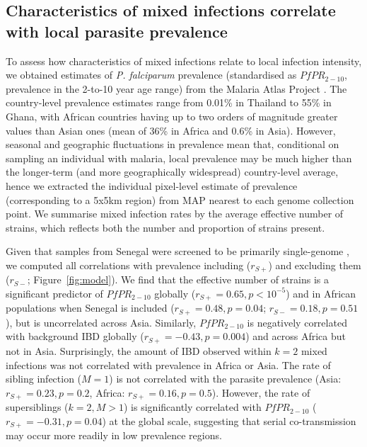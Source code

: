 \documentclass[9pt,lineno]{elife}
\begin{document}
\subsection{Characteristics of mixed infections correlate with local parasite prevalence}

To assess how characteristics of mixed infections relate to local infection intensity, we obtained estimates of {\it P. falciparum} prevalence (standardised as $PfPR_{2-10}$, prevalence in the 2-to-10 year age range) from the Malaria Atlas Project \citep[see Table~\ref{tab:Pf3k}]{MAP2017}. The country-level prevalence estimates range from 0.01\% in Thailand to 55\% in Ghana, with African countries having up to two orders of magnitude greater values than Asian ones (mean of 36\% in Africa and 0.6\% in Asia). However, seasonal and geographic fluctuations in prevalence mean that, conditional on sampling an individual with malaria, local prevalence may be much higher than the longer-term (and more geographically widespread) country-level average, hence we extracted the individual pixel-level estimate of prevalence (corresponding to a 5x5km region) from MAP nearest to each genome collection point. We summarise mixed infection rates by the average effective number of strains, which reflects both the number and proportion of strains present.

Given that samples from Senegal were screened to be primarily single-genome \citep{Daniels2015}, we computed all correlations with prevalence including ($r_{S+}$) and excluding them ($r_{S-}$; Figure~\ref{fig:model}). We find that the effective number of strains is a significant predictor of $PfPR_{2-10}$ globally ($r_{S+} = 0.65, p < 10^{-5}$) and in African populations when Senegal is included ($r_{S+} = 0.48, p=0.04$; $r_{S-} = 0.18, p=0.51$), but is uncorrelated across Asia.  Similarly, $PfPR_{2-10}$ is negatively correlated with background IBD globally ($r_{S+} = -0.43, p=0.004$) and across Africa but not in Asia.  Surprisingly, the amount of IBD observed within $k=2$ mixed infections was not correlated with prevalence in Africa or Asia. The rate of sibling infection ($M=1$) is not correlated with the parasite prevalence (Asia: $r_{S+} = 0.23, p=0.2$, Africa: $r_{S+} = 0.16, p=0.5$). However, the rate of supersiblings ($k=2, M>1$) is significantly correlated with $PfPR_{2-10}$ ($r_{S+} = -0.31, p=0.04$) at the global scale, suggesting that serial co-transmission may occur more readily in low prevalence regions.
\end{document}
